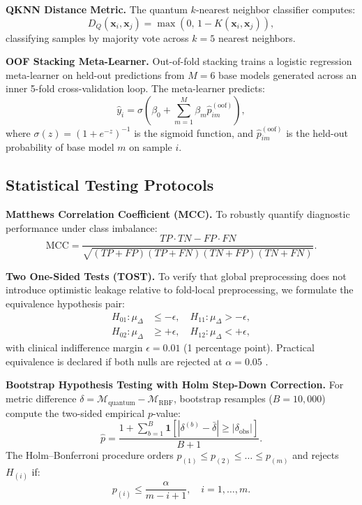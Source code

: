 \documentclass[journal,twocolumn]{IEEEtran}
\begin{document}
\textbf{QKNN Distance Metric.} The quantum $k$-nearest neighbor classifier computes:
\begin{equation}
    D_Q(\mathbf{x}_i, \mathbf{x}_j) = \max\!\left(0,\, 1 - K(\mathbf{x}_i, \mathbf{x}_j)\right),
    \label{eq:qknn_dist}
\end{equation}
classifying samples by majority vote across $k=5$ nearest neighbors.

\textbf{OOF Stacking Meta-Learner.} Out-of-fold stacking trains a logistic regression meta-learner on held-out predictions from $M=6$ base models generated across an inner 5-fold cross-validation loop. The meta-learner predicts:
\begin{equation}
    \hat{y}_i = \sigma\!\left(\beta_0 + \sum_{m=1}^{M} \beta_m \hat{p}_{im}^{(\text{oof})}\right),
    \label{eq:oof_stack}
\end{equation}
where $\sigma(z) = (1 + e^{-z})^{-1}$ is the sigmoid function, and $\hat{p}_{im}^{(\text{oof})}$ is the held-out probability of base model $m$ on sample $i$.

\subsection{Statistical Testing Protocols}

\textbf{Matthews Correlation Coefficient (MCC).} To robustly quantify diagnostic performance under class imbalance:
\begin{equation}
    \text{MCC} = \frac{TP \cdot TN - FP \cdot FN}{\sqrt{(TP+FP)(TP+FN)(TN+FP)(TN+FN)}}.
    \label{eq:mcc}
\end{equation}

\textbf{Two One-Sided Tests (TOST).} To verify that global preprocessing does not introduce optimistic leakage relative to fold-local preprocessing, we formulate the equivalence hypothesis pair:
\begin{align}
    H_{01}: \mu_\Delta &\leq -\epsilon, \quad H_{11}: \mu_\Delta > -\epsilon, \label{eq:tost1}\\
    H_{02}: \mu_\Delta &\geq +\epsilon, \quad H_{12}: \mu_\Delta < +\epsilon, \label{eq:tost2}
\end{align}
with clinical indifference margin $\epsilon = 0.01$ (1 percentage point). Practical equivalence is declared if both nulls are rejected at $\alpha = 0.05$ \cite{wellek2010testing}.

\textbf{Bootstrap Hypothesis Testing with Holm Step-Down Correction.} For metric difference $\delta = \mathcal{M}_{\text{quantum}} - \mathcal{M}_{\text{RBF}}$, bootstrap resamples ($B=10{,}000$) compute the two-sided empirical $p$-value:
\begin{equation}
    \hat{p} = \frac{1 + \sum_{b=1}^{B} \mathbf{1}[|\delta^{(b)} - \bar{\delta}| \geq |\delta_{\text{obs}}|]}{B + 1}.
    \label{eq:bootstrap_p}
\end{equation}
The Holm--Bonferroni procedure orders $p_{(1)} \le p_{(2)} \le \dots \le p_{(m)}$ and rejects $H_{(i)}$ if:
\begin{equation}
    p_{(i)} \le \frac{\alpha}{m - i + 1}, \quad i = 1, \dots, m.
    \label{eq:holm}
\end{equation}
\end{document}
